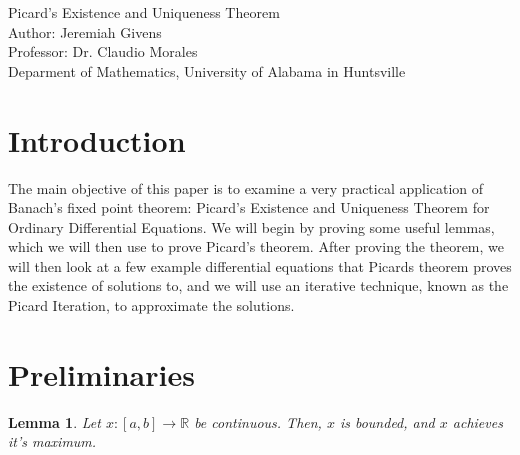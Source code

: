 \documentclass[10pt,a4paper]{article}
\author{Jeremiah Givens}
\theoremstyle{theorem}
\newtheorem{lemma}{Lemma}
\theoremstyle{definition}
\begin{document}
\begin{titlepage}
\vspace*{\fill}
\begin{center}
{\Huge Picard's Existence and Uniqueness Theorem}\\
Author: Jeremiah Givens\\
Professor: Dr. Claudio Morales\\
Deparment of Mathematics, University of Alabama in Huntsville
\end{center}
\vspace*{\fill}
\end{titlepage}

\section{Introduction}
The main objective of this paper is to examine a very practical application of Banach's fixed point theorem: Picard's Existence and Uniqueness Theorem for Ordinary Differential Equations. We will begin by proving some useful lemmas, which we will then use to prove Picard's theorem. After proving the theorem, we will then look at a few example differential equations that Picards theorem proves the existence of solutions to, and we will use an iterative technique, known as the Picard Iteration, to approximate the solutions.

\section{Preliminaries}
\begin{lemma}
Let $x: [a, b] \to \mathbb{R}$ be continuous. Then, $x$ is bounded, and $x$ achieves it's maximum.
\end{lemma}
\end{document}
